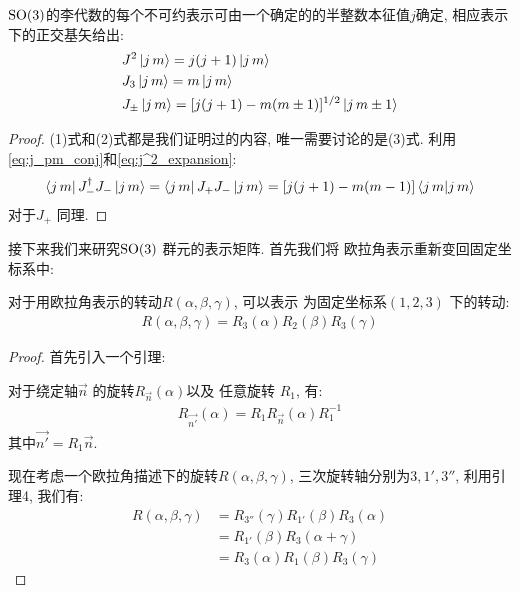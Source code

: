\begin{theorem}
  \color{black}
  ${\rm SO}(3)$的李代数的每个不可约表示可由一个确定的的半整数本征值$j$确定, 相应表示下的正交基矢给出:
  \begin{equation}
    \begin{aligned}
      &J^{2}\ket{j\,m} = j(j+1)\ket{j\,m}\\
      &J_3\ket{j\,m} = m \ket{j\,m}\\
      &J_{\pm}\ket{j\,m} = [j(j+1)-m(m\pm 1)]^{1 / 2}\ket{j\,m\pm 1}
    \end{aligned}
  \end{equation}
\end{theorem}
\begin{proof}
  (1)式和(2)式都是我们证明过的内容, 唯一需要讨论的是(3)式. 利用\ref{eq:j_pm_conj}和\ref{eq:j^2_expansion}:
  \begin{equation}
    \begin{aligned}
      \bra{j\,m} J_{-}^{\dagger} J_{-} \ket{j\,m} = \bra{j\,m}J_{+}J_{-}\ket{j\,m} = [j(j+1)-m(m-1)]\bra{j\,m}\ket{j\,m}
    \end{aligned}
  \end{equation}
  对于$J_{+}$ 同理.
\end{proof}

接下来我们来研究${\rm SO}(3)$ 群元的表示矩阵. 首先我们将
欧拉角表示重新变回固定坐标系中:

\begin{theorem}
  对于用欧拉角表示的转动$R(\alpha, \beta, \gamma)$, 可以表示
  为固定坐标系$(1,2,3)$ 下的转动:
  \begin{equation}
    \begin{aligned}
      R(\alpha, \beta, \gamma) = R_3(\alpha)R_2(\beta)R_3(\gamma)
    \end{aligned}
  \end{equation}
\end{theorem}
\begin{proof}
  首先引入一个引理:\\
  \begin{lemma}
    对于绕定轴$\vec{n}$ 的旋转$R_{\vec{n}}(\alpha)$以及
    任意旋转 $R_1$, 有:
    \begin{equation}
      \begin{aligned}
        R_{\vec{n'}}(\alpha) = R_1 R_{\vec{n}}(\alpha) R_1^{-1}
      \end{aligned}
    \end{equation}
    其中$\vec{n'} = R_1 \vec{n}$.
  \end{lemma}
  现在考虑一个欧拉角描述下的旋转$R(\alpha, \beta, \gamma)$,
  三次旋转轴分别为$3, 1',3''$, 利用引理4, 我们有:
   \begin{equation}
    \begin{aligned}
      R(\alpha, \beta, \gamma) &= R_{3''}(\gamma) R_{1'}(\beta) R_{3}(\alpha)\\
        &= R_{1'}(\beta)R_{3}(\alpha+\gamma)\\
        &= R_{3}(\alpha)R_{1}(\beta)R_{3}(\gamma)
    \end{aligned}
  \end{equation}
\end{proof}

